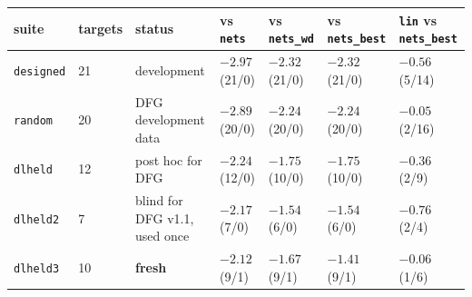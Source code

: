 \begin{tabular}{lllllll}
\toprule
suite & targets & status & vs \texttt{nets} & vs \texttt{nets\_wd} & vs \texttt{nets\_best} & \texttt{lin} vs \texttt{nets\_best}\\
\midrule
\texttt{designed} & 21 & development & $-2.97$ (21/0) & $-2.32$ (21/0) & $-2.32$ (21/0) & $-0.56$ (5/14)\\
\texttt{random} & 20 & DFG development data & $-2.89$ (20/0) & $-2.24$ (20/0) & $-2.24$ (20/0) & $-0.05$ (2/16)\\
\texttt{dlheld} & 12 & post hoc for DFG & $-2.24$ (12/0) & $-1.75$ (10/0) & $-1.75$ (10/0) & $-0.36$ (2/9)\\
\texttt{dlheld2} & 7 & blind for DFG v1.1, used once & $-2.17$ (7/0) & $-1.54$ (6/0) & $-1.54$ (6/0) & $-0.76$ (2/4)\\
\texttt{dlheld3} & 10 & \textbf{fresh} & $-2.12$ (9/1) & $-1.67$ (9/1) & $-1.41$ (9/1) & $-0.06$ (1/6)\\
\bottomrule
\end{tabular}
